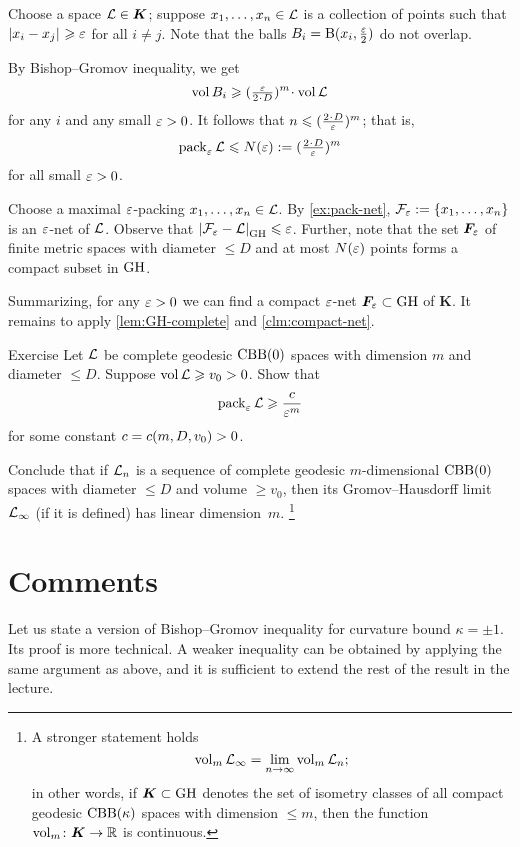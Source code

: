 Choose a space $\mathcal{L}\in \bm{K}$;
suppose $x_1,\dots,x_n\in \mathcal{L}$ is a collection of points such that $\dist{x_i}{x_j}{}\ge \eps$ for all $i\ne j$.
Note that the balls $B_i=\mathrm{B}{}(x_i,\tfrac{\varepsilon}2)$ do not overlap.

By Bishop--Gromov inequality, we get 
\[\vol B_i\ge (\tfrac\eps{2\cdot D})^m\cdot\vol \spc{L}\]
for any $i$ and any small $\varepsilon>0$.
It follows that $n\le (\tfrac{2\cdot D}\eps)^m$;
that is, 
\[\pack_\eps\spc{L}\le  N(\eps)\df(\tfrac{2\cdot D}\eps)^m\]
for all small $\varepsilon>0$.

Choose a maximal $\varepsilon$-packing $x_1,\dots,x_n\in \mathcal{L}$.
By \ref{ex:pack-net}, $\spc{F}_\eps\z\df\{x_1,\dots,x_n\}$ is an $\varepsilon$-net of $\mathcal{L}$.
Observe that $\dist{\spc{F}_\eps}{\spc{L}}{\GH}\le \eps$.
Further, note that the set $\bm{F}_\varepsilon$ of finite metric spaces with diameter $\le D$ and at most $N(\varepsilon)$ points forms a compact subset in $\operatorname{\rm GH}\nolimits$.

Summarizing, for any $\varepsilon>0$ we can find a compact $\varepsilon$-net $\bm{F}_\varepsilon\subset \operatorname{\rm GH}\nolimits$ of $\bm{K}$.
It remains to apply \ref{lem:GH-complete} and \ref{clm:compact-net}.
\qeds

\begin{thm}{Exercise}\label{ex:pack-vol}
Let $\mathcal{L}$ be complete geodesic $\mathrm{CBB}(0)$ spaces with dimension $m$ and diameter $\le D$.
Suppose $\operatorname{\rm vol}\nolimits\mathcal{L}\geqslant v_0>0$.
Show that 
\[\operatorname{\rm pack}\nolimits_\varepsilon\mathcal{L}\geqslant \frac{c}{\varepsilon^m}\]
for some constant $c=c(m,D,v_0)>0$.

Conclude that if $\mathcal{L}_n$ is a sequence of complete geodesic $m$-dimensional $\mathrm{CBB}(0)$ spaces with diameter $\le D$ and volume $\ge v_0$, then its Gromov--Hausdorff limit $\mathcal{L}_\infty$ (if it is defined) has linear dimension~$m$.%
\footnote{A stronger statement holds 
\[\operatorname{\rm vol}\nolimits_m\mathcal{L}_\infty=\lim_{n\to\infty} \operatorname{\rm vol}\nolimits_m\mathcal{L}_n;\]
in other words, if $\bm{K}\subset \operatorname{\rm GH}\nolimits$ denotes the set of isometry classes of all compact geodesic $\mathrm{CBB}(\kappa)$ spaces with dimension $\le m$, then the function
$\operatorname{\rm vol}\nolimits_m\colon\bm{K}\to \mathbb{R}$ is continuous.}
\end{thm}

\section{Comments}

Let us state a version of Bishop--Gromov inequality for curvature bound $\kappa=\pm1$.
Its proof is more technical.
A weaker inequality can be obtained by applying the same argument as above,
and it is sufficient to extend the rest of the result in the lecture.

